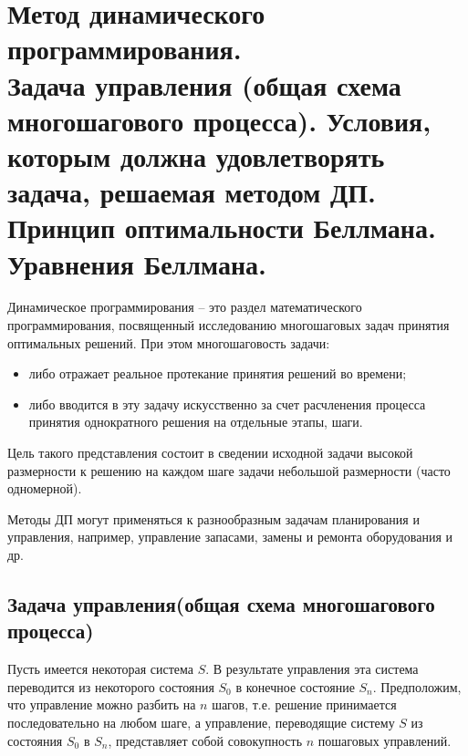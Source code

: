 \documentclass[17pt]{extarticle}
\begin{document}
\section{Метод динамического программирования. \\ Задача управления (общая схема
  многошагового процесса). Условия, которым должна удовлетворять задача, решаемая
  методом ДП. \\ Принцип оптимальности Беллмана. \\ Уравнения Беллмана.}
\begin{definition}
    Динамическое программирования -- это раздел математического программирования,
    посвященный исследованию многошаговых задач
    принятия оптимальных решений.
    При этом многошаговость задачи:
    \begin{itemize}
        \item либо отражает реальное протекание принятия решений во времени;
        \item либо вводится в эту задачу искусственно за счет расчленения процесса принятия однократного решения на отдельные этапы, шаги.
    \end{itemize}
\end{definition}

Цель такого представления состоит в сведении
исходной задачи высокой размерности к решению
на каждом шаге задачи небольшой размерности
(часто одномерной).

Методы ДП могут применяться к разнообразным
задачам планирования и управления, например,
управление запасами, замены и ремонта
оборудования и др.

\subsection{Задача управления(общая схема многошагового процесса)}
Пусть имеется некоторая система $S$.
В результате управления эта система переводится из некоторого состояния $S_0$ в конечное состояние $S_n$.
Предположим, что управление можно разбить на $n$ шагов, т.е. решение принимается последовательно на любом шаге,
а управление, переводящие систему $S$ из состояния $S_0$ в $S_n$, представляет собой совокупность $n$ пошаговых управлений.

\end{document}
